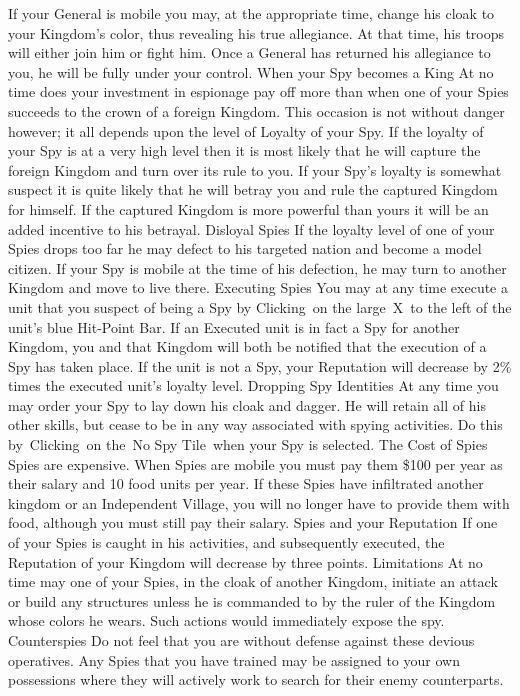 If your General is mobile you may, at the appropriate time, change his cloak to your Kingdom’s color, thus revealing his true allegiance. At that time, his troops will either join him or fight him.
Once a General has returned his allegiance to you, he will be fully under your control.
When your Spy becomes a King
At no time does your investment in espionage pay off more than when one of your Spies succeeds to the crown of a foreign Kingdom. This occasion is not without danger however; it all depends upon the level of Loyalty of your Spy.
If the loyalty of your Spy is at a very high level then it is most likely that he will capture the foreign Kingdom and turn over its rule to you.
If your Spy’s loyalty is somewhat suspect it is quite likely that he will betray you and rule the captured Kingdom for himself. If the captured Kingdom is more powerful than yours it will be an added incentive to his betrayal.
Disloyal Spies
If the loyalty level of one of your Spies drops too far he may defect to his targeted nation and become a model citizen.
If your Spy is mobile at the time of his defection, he may turn to another Kingdom and move to live there.
Executing Spies
You may at any time execute a unit that you suspect of being a Spy by Clicking on the large X to the left of the unit’s blue Hit-Point Bar. If an Executed unit is in fact a Spy for another Kingdom, you and that Kingdom will both be notified that the execution of a Spy has taken place.
If the unit is not a Spy, your Reputation will decrease by 2\% times the executed unit’s loyalty level.
Dropping Spy Identities
At any time you may order your Spy to lay down his cloak and dagger. He will retain all of his other skills, but cease to be in any way associated with spying activities. Do this by Clicking on the No Spy Tile when your Spy is selected.
The Cost of Spies
Spies are expensive. When Spies are mobile you must pay them \$100 per year as their salary and 10 food units per year.
If these Spies have infiltrated another kingdom or an Independent Village, you will no longer have to provide them with food, although you must still pay their salary.
Spies and your Reputation
If one of your Spies is caught in his activities, and subsequently executed, the Reputation of your Kingdom will decrease by three points.
Limitations
At no time may one of your Spies, in the cloak of another Kingdom, initiate an attack or build any structures unless he is commanded to by the ruler of the Kingdom whose colors he wears. Such actions would immediately expose the spy.
Counterspies
Do not feel that you are without defense against these devious operatives. Any Spies that you have trained may be assigned to your own possessions where they will actively work to search for their enemy counterparts.
